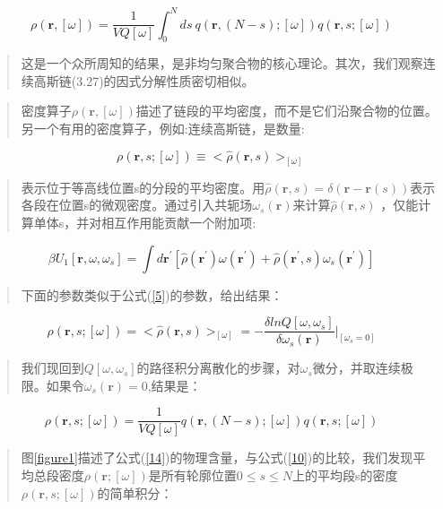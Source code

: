 \begin{equation}\label{10}
\rho(\mathbf{r},[\omega])=\frac{1}{VQ[\omega]}\int_{0}^{N}ds~q(\mathbf{r},(N-s);[\omega])q(\mathbf{r},s;[\omega])
\end{equation}
\begin{quotation}
这是一个众所周知的结果，是非均匀聚合物的核心理论。其次，我们观察连续高斯链(3.27)的因式分解性质密切相似。
\end{quotation}
\begin{quotation}
密度算子$\rho(\mathbf{r},[\omega])$描述了链段的平均密度，而不是它们沿聚合物的位置。另一个有用的密度算子，例如:连续高斯链，是数量:
\end{quotation}
\begin{equation}\label{11}
\rho(\mathbf{r},s;[\omega])\equiv <\hat{\rho}(\mathbf{r},s)>_{[\omega]}
\end{equation}
\begin{quotation}
表示位于等高线位置s的分段的平均密度。用$\hat{\rho}(\mathbf{r},s)=\delta(\mathbf{r}-\mathbf{r}(s))$表示各段在位置s的微观密度。通过引入共轭场$\omega_s(\mathbf{r})$来计算$\hat{\rho}(\mathbf{r},s)$
，仅能计算单体s，并对相互作用能贡献一个附加项:
\end{quotation}
\begin{equation}\label{12}
\beta U_1[\mathbf{r},\omega ,\omega_s]=\int d\mathbf{r}^{'}[\hat{\rho}(\mathbf{r}^{'})\omega (\mathbf{r}^{'})+\hat{\rho}(\mathbf{r}^{'},s)\omega_s(\mathbf{r}^{'})]
\end{equation}
\begin{quotation}
下面的参数类似于公式(\ref{5})的参数，给出结果：
\end{quotation}
\begin{equation}\label{13}
\rho(\mathbf{r},s;[\omega])=<\hat{\rho}(\mathbf{r},s)>_{[\omega]}
=-\frac{\delta lnQ[\omega,\omega_s]}{\delta \omega_s(\mathbf{r})} \bigg |_{[\omega_s=0]}
\end{equation}
\begin{quotation}
我们现回到$Q[\omega,\omega_s]$的路径积分离散化的步骤，对$\omega_s$微分，并取连续极限。如果令$\omega_s(\mathbf{r})=0$,结果是：
\end{quotation}
\begin{equation}\label{14}
\rho(\mathbf{r},s;[\omega])=\frac{1}{VQ[\omega]}q(\mathbf{r},(N-s);[\omega])q(\mathbf{r},s;[\omega])
\end{equation}
\begin{quotation}
图\ref{figure1}描述了公式(\ref{14})的物理含量，与公式(\ref{10})的比较，我们发现平均总段密度$\rho(\mathbf{r};[\omega])$是所有轮廓位置$0\le s\le N$上的平均段s的密度$\rho(\mathbf{r},s;[\omega])$的简单积分：
\end{quotation}
